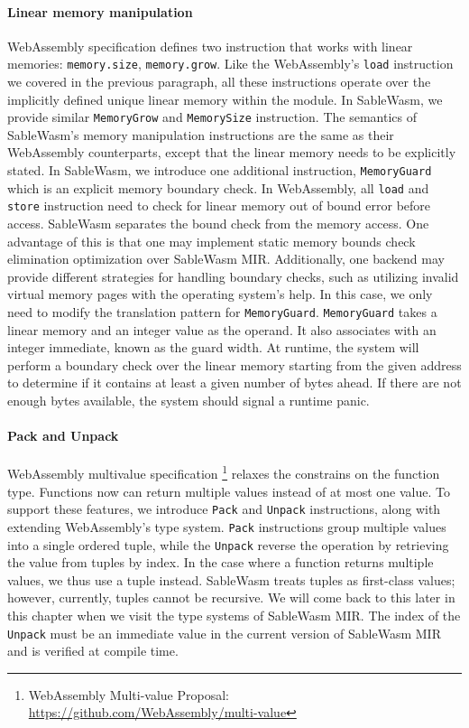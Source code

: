 \paragraph{Linear memory manipulation}
WebAssembly specification defines two instruction that works with linear
memories: \texttt{memory.size}, \texttt{memory.grow}. Like the WebAssembly's
\texttt{load} instruction we covered in the previous paragraph, all these
instructions operate over the implicitly defined unique linear memory within the
module. In SableWasm, we provide similar \texttt{MemoryGrow} and
\texttt{MemorySize} instruction. The semantics of SableWasm's memory
manipulation instructions are the same as their WebAssembly counterparts, except
that the linear memory needs to be explicitly stated. In SableWasm, we introduce
one additional instruction, \texttt{MemoryGuard} which is an explicit memory
boundary check. In WebAssembly, all \texttt{load} and \texttt{store} instruction
need to check for linear memory out of bound error before access. SableWasm
separates the bound check from the memory access. One advantage of this is that
one may implement static memory bounds check elimination optimization over
SableWasm MIR. Additionally, one backend may provide different strategies for
handling boundary checks, such as utilizing invalid virtual memory pages with
the operating system's help. In this case, we only need to modify the
translation pattern for \texttt{MemoryGuard}. \texttt{MemoryGuard} takes a
linear memory and an integer value as the operand. It also associates with an
integer immediate, known as the guard width. At runtime, the system will perform
a boundary check over the linear memory starting from the given address to
determine if it contains at least a given number of bytes ahead. If there are
not enough bytes available, the system should signal a runtime panic.

\paragraph{Pack and Unpack}
WebAssembly multivalue specification \footnote{WebAssembly Multi-value Proposal:
  \url{https://github.com/WebAssembly/multi-value}} relaxes the constrains on
the function type. Functions now can return multiple values instead of at most
one value. To support these features, we introduce \texttt{Pack} and
\texttt{Unpack} instructions, along with extending WebAssembly's type system.
\texttt{Pack} instructions group multiple values into a single ordered tuple,
while the \texttt{Unpack} reverse the operation by retrieving the value from
tuples by index. In the case where a function returns multiple values, we thus
use a tuple instead. SableWasm treats tuples as first-class values; however,
currently, tuples cannot be recursive. We will come back to this later in this
chapter when we visit the type systems of SableWasm MIR. The index of the
\texttt{Unpack} must be an immediate value in the current version of SableWasm
MIR and is verified at compile time.

